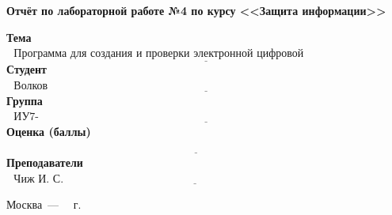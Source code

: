 \begin{titlepage}
	\begin{center}
		\Large\textbf{Отчёт по лабораторной работе №4 по курсу <<Защита информации>>}
	\end{center}


	\noindent\textbf{Тема} $\underline{\text{~~Программа для создания и проверки электронной цифровой подписи~~~~~~~~~~~~~~~~~~~~~}}$\newline\newline
	\noindent\textbf{Студент} $\underline{\text{~~Волков Г.В.~~~~~~~~~~~~~~~~~~~~~~~~~~~~~~~~~~~~~~~~~~~~~~~~~~~~~~~~~~~~~~~~~~~~~~~~~~~~~~~~~~~~~~~~~~~~~~~~}}$\newline\newline
	\noindent\textbf{Группа} $\underline{\text{~~ИУ7-71Б~~~~~~~~~~~~~~~~~~~~~~~~~~~~~~~~~~~~~~~~~~~~~~~~~~~~~~~~~~~~~~~~~~~~~~~~~~~~~~~~~~~~~~~~~~~~~~~~~~~~~~}}$\newline\newline
	\noindent\textbf{Оценка (баллы)} $\underline{\text{~~~~~~~~~~~~~~~~~~~~~~~~~~~~~~~~~~~~~~~~~~~~~~~~~~~~~~~~~~~~~~~~~~~~~~~~~~~~~~~~~~~~~~~~~~~~~~~~~~~~~~~}}$\newline\newline
	\noindent\textbf{Преподаватели} $\underline{\text{~~Чиж И.~С.~~~~~~~~~~~~~~~~~~~~~~~~~~~~~~~~~~~~~~~~~~~~~~~~~~~~~~~~~~~~~~~~~~~~~~~~~~~~~~~~~~~~~~~}}$\newline

	\begin{center}
		\vfill
		Москва~---~\the\year
		~г.
	\end{center}
	\restoregeometry
\end{titlepage}

